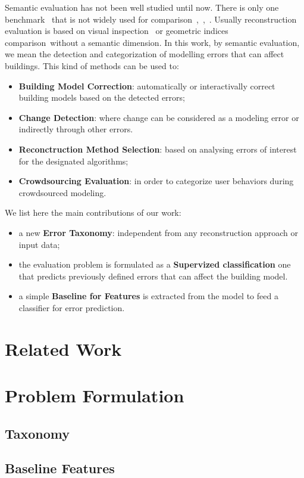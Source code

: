 \documentclass[runningheads]{llncs}
\begin{document}
	Semantic evaluation has not been well studied until now. There is only one benchmark~\cite{rottensteiner2014results} that is not widely used for comparison~\cite{Lafarge2012},~\cite{nguatem2017modeling},~\cite{li2016boxfitting}. Usually reconstruction evaluation is based on visual inspection~\cite{Musialski2012} or geometric indices comparison\ without a semantic dimension. In this work, by semantic evaluation, we mean the detection and categorization of modelling errors that can affect buildings. This kind of methods can be used to:
	\begin{itemize}
		\item \textbf{Building Model Correction}: automatically or interactivally correct building models based on the detected errors;
		\item \textbf{Change Detection}: where change can be considered as a modeling error or indirectly through other errors.
		\item \textbf{Reconctruction Method Selection}: based on analysing errors of interest for the designated algorithms;
		\item \textbf{Crowdsourcing Evaluation}: in order to categorize user behaviors during crowdsourced modeling.
	\end{itemize}
	
	We list here the main contributions of our work:
	\begin{itemize}
		\item a new \textbf{Error Taxonomy}: independent from any reconstruction approach or input data;
		\item the evaluation problem is formulated as a \textbf{Supervized classification} one that predicts previously defined errors that can affect the building model.
		\item a simple \textbf{Baseline for Features} is extracted from the model to feed a classifier for error prediction.
	\end{itemize}
\section{Related Work}
\section{Problem Formulation}
\subsection{Taxonomy}
\subsection{Baseline Features}
\end{document}
